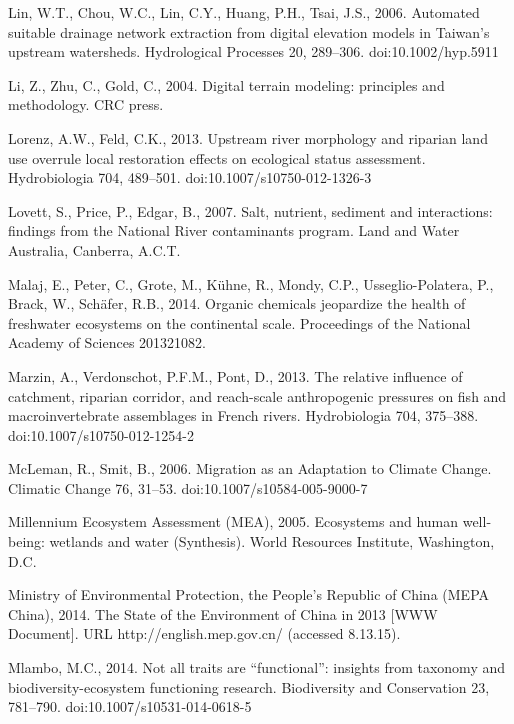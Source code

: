 \begin{thebibliography}
\bibitem{} \hangindent=1cm Lin, W.T., Chou, W.C., Lin, C.Y., Huang, P.H., Tsai, J.S., 2006. Automated suitable drainage network extraction from digital elevation models in Taiwan’s upstream watersheds. Hydrological Processes 20, 289–306. doi:10.1002/hyp.5911

\bibitem{} \hangindent=1cm Li, Z., Zhu, C., Gold, C., 2004. Digital terrain modeling: principles and methodology. CRC press.

\bibitem{} \hangindent=1cm Lorenz, A.W., Feld, C.K., 2013. Upstream river morphology and riparian land use overrule local restoration effects on ecological status assessment. Hydrobiologia 704, 489–501. doi:10.1007/s10750-012-1326-3

\bibitem{} \hangindent=1cm Lovett, S., Price, P., Edgar, B., 2007. Salt, nutrient, sediment and interactions: findings from the National River contaminants program. Land and Water Australia, Canberra, A.C.T.

\bibitem{} \hangindent=1cm Malaj, E., Peter, C., Grote, M., Kühne, R., Mondy, C.P., Usseglio-Polatera, P., Brack, W., Schäfer, R.B., 2014. Organic chemicals jeopardize the health of freshwater ecosystems on the continental scale. Proceedings of the National Academy of Sciences 201321082.

\bibitem{} \hangindent=1cm Marzin, A., Verdonschot, P.F.M., Pont, D., 2013. The relative influence of catchment, riparian corridor, and reach-scale anthropogenic pressures on fish and macroinvertebrate assemblages in French rivers. Hydrobiologia 704, 375–388. doi:10.1007/s10750-012-1254-2

\bibitem{} \hangindent=1cm McLeman, R., Smit, B., 2006. Migration as an Adaptation to Climate Change. Climatic Change 76, 31–53. doi:10.1007/s10584-005-9000-7

\bibitem{} \hangindent=1cm Millennium Ecosystem Assessment (MEA), 2005. Ecosystems and human well-being: wetlands and water (Synthesis). World Resources Institute, Washington, D.C.

\bibitem{} \hangindent=1cm Ministry of Environmental Protection, the People’s Republic of China (MEPA China), 2014. The State of the Environment of China in 2013 [WWW Document]. URL http://english.mep.gov.cn/ (accessed 8.13.15).

\bibitem{} \hangindent=1cm Mlambo, M.C., 2014. Not all traits are “functional”: insights from taxonomy and biodiversity-ecosystem functioning research. Biodiversity and Conservation 23, 781–790. doi:10.1007/s10531-014-0618-5


\end{thebibliography}
